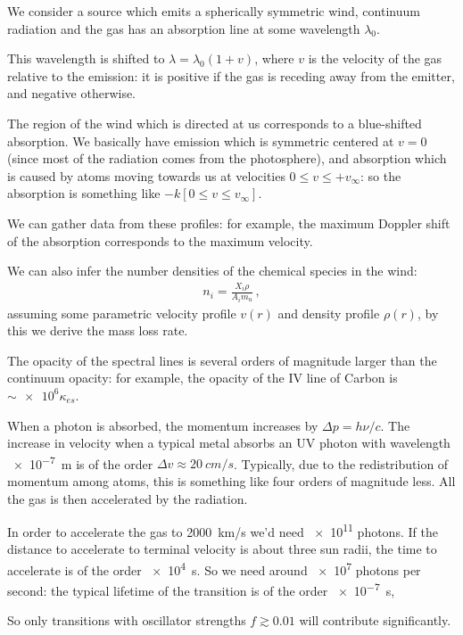 \documentclass[main.tex]{subfiles}
\begin{document}
We consider a source which emits a spherically symmetric wind, continuum radiation and the gas has an absorption line at some wavelength \(\lambda_0 \). 

This wavelength is shifted to \(\lambda = \lambda_0 (1 + v)\), where \(v\) is the velocity of the gas relative to the emission: it is positive if the gas is receding away from the emitter, and negative otherwise.

The region of the wind which is directed at us corresponds to a blue-shifted absorption.
We basically have emission which is symmetric centered at \(v=0\) (since most of the radiation comes from the photosphere), and absorption which is caused by atoms moving towards us at velocities \(0 \leq v \leq + v_\infty\): so the absorption is something like \(- k [0 \leq v \leq v_\infty]\).

We can gather data from these profiles: for example, the maximum Doppler shift of the absorption corresponds to the maximum velocity.

We can also infer the number densities of the chemical species in the wind: 
%
\begin{align}
  n_i  = \frac{X_i \rho }{A_i m_u}
\,,
\end{align}
%
assuming some parametric velocity profile \(v(r)\) and density profile \(\rho (r)\), by this we derive the mass loss rate.

The opacity of the spectral lines is several orders of magnitude larger than the continuum opacity: for example, the opacity of the IV line of Carbon is \(\sim \num{e6} \kappa_{es}\).

When a photon is absorbed, the momentum increases by \(\Delta p = h \nu / c \). 
The increase in velocity when a typical metal absorbs an UV photon with wavelength \SI{e-7}{m} is of the order \(\Delta v \approx \SI{20}{cm/s}\). Typically, due to the redistribution of momentum among atoms, this is something like four orders of magnitude less.
All the gas is then accelerated by the radiation.

In order to accelerate the gas to \SI{2000}{km/s} we'd need \num{e11} photons.
If the distance to accelerate to terminal velocity is about three sun radii, the time to accelerate is of the order \SI{e4}{s}.
So we need around \num{e7} photons per second: the typical lifetime of the transition is of the order \SI{e-7}{s}, 

So only transitions with oscillator strengths \(f \gtrsim 0.01\) will contribute significantly.
\end{document}
